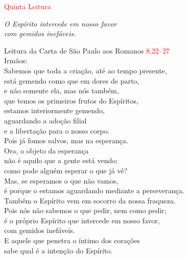 \documentclass{book}
\begin{document}
\begin{center}

    \textcolor{red}{Quinta Leitura}

\end{center}

\begin{flushright}
    \textit{O Espírito intercede em nosso favor \\ com gemidos inefáveis.}
\end{flushright}

\begin{flushleft}

    \vspace{.2cm}
    Leitura da Carta de São Paulo aos Romanos
    \hspace{\fill}
    \textcolor{red}{8,22--27}
    \vspace{.2cm} \\
    Irmãos: \\
    Sabemos que toda a criação, até ao tempo presente, \\
    está gemendo como que em dores de parto, \\
    e não somente ela, mas nós também, \\
    que temos os primeiros frutos do Espíritos, \\
    estamos interiormente gemendo, \\
    aguardando a adoção filial \\
    e a libertação para o nosso corpo. \\
    Pois já fomos salvos, mas na esperança. \\
    Ora, o objeto da esperança \\
    não é aquilo que a gente está vendo; \\
    como pode alguém esperar o que já vê? \\
    Mas, se esperamos o que não vamos, \\
    é porque o estamos aguardando mediante a perseverança. \\
    Também o Espírito vem em socorro da nossa fraqueza. \\
    Pois nós não sabemos o que pedir, nem como pedir; \\
    é o próprio Espírito que intercede em nosso favor, \\
    com gemidos inefáveis. \\
    E aquele que penetra o íntimo dos corações \\
    sabe qual é a intenção do Espírito. \\

\end{flushleft}
\end{document}
